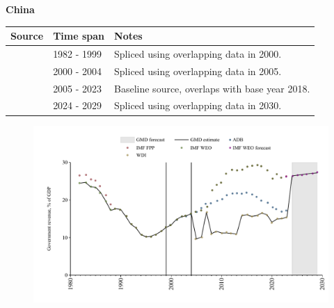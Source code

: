 \documentclass[12pt,a4paper,landscape]{article}
\begin{document}
\begin{adjustbox}{max totalsize={\paperwidth}{\paperheight},center}
\begin{minipage}[t][\textheight][t]{\textwidth}
\vspace*{0.5cm}
{}
\begin{center}
{\Large\bfseries China}
\end{center}
\vspace{0.5cm}
\begin{table}[H]
\centering
\small
\begin{tabular}{|l|l|l|}
\hline
\textbf{Source} & \textbf{Time span} & \textbf{Notes} \\
\hline
\rowcolor{white}\cite{IMF_WEO}& 1982 - 1999 &Spliced using overlapping data in 2000.\\
\rowcolor{lightgray}\cite{ADB}& 2000 - 2004 &Spliced using overlapping data in 2005.\\
\rowcolor{white}\cite{WDI}& 2005 - 2023 &Baseline source, overlaps with base year 2018.\\
\rowcolor{lightgray}\cite{IMF_WEO_forecast}& 2024 - 2029 &Spliced using overlapping data in 2030.\\
\hline
\end{tabular}
\end{table}
\begin{figure}[H]
\centering
\includegraphics[width=\textwidth,height=0.6\textheight,keepaspectratio]{graphs/CHN_govrev_GDP.pdf}
\end{figure}
\end{minipage}
\end{adjustbox}
\end{document}
